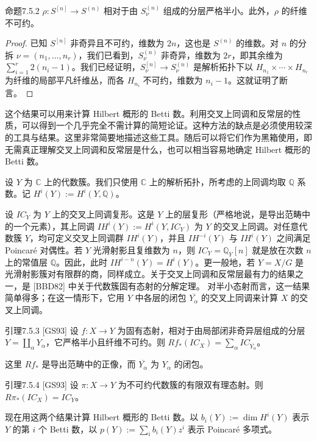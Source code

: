 \begin{origstatement}{命题}{7.5.2}\label{ch07:7.5.2}
$\rho:S^{[n]}\to S^{(n)}$ 相对于由 $S_\nu^{(n)}$ 组成的分层严格半小。此外，$\rho$ 的纤维不可约。
\end{origstatement}
\begin{proof}
已知 $S^{[n]}$ 非奇异且不可约，维数为 $2n$，这也是 $S^{(n)}$ 的维数。对 $n$ 的分拆 $\nu=(n_1,\ldots,n_r)$，我们已看到，$S_\nu^{(n)}$ 非奇异，维数为 $2r$，即其余维为 $\sum_{i=1}^r2(n_i-1)$。我们已经证明，$S_\nu^{[n]}\to S_\nu^{(n)}$ 是解析拓扑下以 $H_{n_1}\times\cdots\times H_{n_r}$ 为纤维的局部平凡纤维丛，而各 $H_{n_i}$ 不可约，维数为 $n_i-1$。这就证明了断言。
\end{proof}
这个结果可以用来计算 Hilbert 概形的 Betti 数。利用交叉上同调和反常层的性质，可以得到一个几乎完全不需计算的简短论证。这种方法的缺点是必须使用较深的工具与结果。这里非常简要地描述这些工具。随后可以将它们作为黑箱使用，即无需真正理解交叉上同调和反常层是什么，也可以相当容易地确定 Hilbert 概形的 Betti 数。

设 $Y$ 为 $\mathbb C$ 上的代数簇。我们只使用 $\mathbb C$ 上的解析拓扑，所考虑的上同调均取 $\mathbb Q$ 系数。记 $H^i(Y):=H^i(Y,\mathbb Q)$。

设 $IC_Y$ 为 $Y$ 上的交叉上同调复形。这是 $Y$ 上的层复形（严格地说，是导出范畴中的一个元素），其上同调 $IH^i(Y):=H^i(Y,IC_Y)$ 为 $Y$ 的交叉上同调。对任意代数簇 $Y$，均可定义交叉上同调群 $IH^i(Y)$，并且 $IH^{-i}(Y)$ 与 $IH^i(Y)$ 之间满足 Poincaré 对偶性。若 $Y$ 光滑射影且复维数为 $n$，则 $IC_Y=\mathbb Q_Y[n]$ 就是放在次数 $n$ 上的常值层 $\mathbb Q$。因此，此时 $IH^{i-n}(Y)=H^i(Y)$。更一般地，若 $Y=X/G$ 是光滑射影簇对有限群的商，同样成立。关于交叉上同调和反常层最有力的结果之一，是 [BBD82] 中关于代数簇固有态射的分解定理。
对半小态射而言，这一结果简单得多；在这一情形下，它用 $Y$ 中各层的闭包 $\overline{Y_\alpha}$ 的交叉上同调来计算 $X$ 的交叉上同调。

\begin{origstatement}{引理}{7.5.3}\label{ch07:7.5.3}
[GS93] 设 $f:X\to Y$ 为固有态射，相对于由局部闭非奇异层组成的分层 $Y=\coprod_\alpha Y_\alpha$，它严格半小且纤维不可约。则 $Rf_*(IC_X)=\sum_\alpha IC_{\overline{Y_\alpha}}$。
\end{origstatement}
这里 $Rf_*$ 是导出范畴中的正像，而 $\overline{Y_\alpha}$ 为 $Y_\alpha$ 的闭包。

\begin{origstatement}{引理}{7.5.4}\label{ch07:7.5.4}
[GS93] 设 $\pi:X\to Y$ 为不可约代数簇的有限双有理态射。则 $R\pi_*(IC_X)=IC_Y$。
\end{origstatement}
现在用这两个结果计算 Hilbert 概形的 Betti 数。以 $b_i(Y):=\dim H^i(Y)$ 表示 $Y$ 的第 $i$ 个 Betti 数，以 $p(Y):=\sum_i b_i(Y)z^i$ 表示 Poincaré 多项式。

